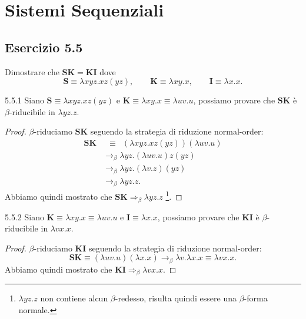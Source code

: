 \chapter{Sistemi Sequenziali}
\label{chap:parte2}

\section*{Esercizio 5.5}
{}

\begin{tcolorbox} \cite{mssc2016}
Dimostrare che  $\mathbf{SK} = \mathbf{KI}$ dove \[
	\mathbf{S} \equiv \lambda{xyz}.xz(yz), \qquad
	\mathbf{K} \equiv \lambda{xy}.x, \qquad
	\mathbf{I} \equiv \lambda{x}.x.
\]
\end{tcolorbox}

\begin{customlemma}{5.5.1} \label{lemma:5.5.1}
Siano $\mathbf{S} \equiv \lambda{xyz}.xz(yz)$ e 
$\mathbf{K}  \equiv \lambda{xy}.x \equiv \lambda{uv}.u$, possiamo provare che $\mathbf{SK}$ è $\beta$-riducibile in $\lambda{yz}.z$.
\end{customlemma}

\begin{proof}
$\beta$-riduciamo $\mathbf{SK}$ seguendo la strategia di riduzione normal-order:
\begin{align*}
\mathbf{SK} & \ \; \equiv \; \ (\lambda{xyz}.xz(yz)) (\lambda{uv}.u) \\
			& \longrightarrow_{\beta} \lambda{yz}.(\lambda{uv}.u)z(yz) \\ 
			& \longrightarrow_{\beta} \lambda{yz}.(\lambda{v}.z)(yz) \\
			& \longrightarrow_{\beta} \lambda{yz}.z.
\end{align*}
Abbiamo quindi mostrato che $\mathbf{SK} \Longrightarrow_{\beta} \lambda{yz}.z$ \footnote{$\lambda{yz}.z$ non contiene alcun $\beta$-redesso, risulta quindi essere una $\beta$-forma normale.}.
\end{proof}

\begin{customlemma}{5.5.2} \label{lemma:5.5.2}
Siano $\mathbf{K} \equiv \lambda{xy}.x \equiv \lambda{uv}.u$ e
$\mathbf{I} \equiv \lambda{x}.x$, 
possiamo provare che $\mathbf{KI}$ è $\beta$-riducibile in $\lambda{vx}.x$.
\end{customlemma}

\begin{proof}
$\beta$-riduciamo $\mathbf{KI}$ seguendo la strategia di riduzione normal-order:\\
\[
\mathbf{SK} \equiv (\lambda{uv}.u) (\lambda{x}.x)
			\longrightarrow_{\beta} \lambda{v}.\lambda{x}.x
			\equiv \lambda{vx}.x.
\]
Abbiamo quindi mostrato che $\mathbf{KI} \Longrightarrow_{\beta} \lambda{vx}.x$.
\end{proof}


